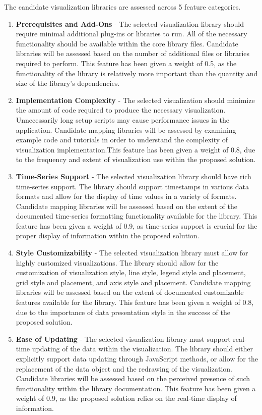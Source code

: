 \documentclass{report}
\begin{document}
The candidate visualization libraries are assessed across 5 feature categories.

\begin{enumerate}

\item \textbf{Prerequisites and Add-Ons} - The selected visualization library should require minimal additional plug-ins or libraries to run. All of the necessary functionality should be available within the core library files. Candidate libraries will be assessed based on the number of additional files or libraries required to perform. This feature has been given a weight of 0.5, as the functionality of the library is relatively more important than the quantity and size of the library's dependencies.

\item \textbf{Implementation Complexity} - The selected visualization should minimize the amount of code required to produce the necessary visualization. Unnecessarily long setup scripts may cause performance issues in the application. Candidate mapping libraries will be assessed by examining example code and tutorials in order to understand the complexity of visualization implementation.This feature has been given a weight of 0.8, due to the frequency and extent of visualization use within the proposed solution.

\item \textbf{Time-Series Support} - The selected visualization library should have rich time-series support. The library should support timestamps in various data formats and allow for the display of time values in a variety of formats. Candidate mapping libraries will be assessed based on the extent of the documented time-series formatting functionality available for the library. This feature has been given a weight of 0.9, as time-series support is crucial for the proper display of information within the proposed solution.

\item \textbf{Style Customizability} - The selected visualization library must allow for highly customized visualizations. The library should allow for the customization of visualization style, line style, legend style and placement, grid style and placement, and axis style and placement. Candidate mapping libraries will be assessed based on the extent of documented customizable features available for the library. This feature has been given a weight of 0.8, due to the importance of data presentation style in the success of the proposed solution.

\item \textbf{Ease of Updating} - The selected visualization library must support real-time updating of the data within the visualization. The library should either explicitly support data updating through JavaScript methods, or allow for the replacement of the data object and the redrawing of the visualization. Candidate libraries will be assessed based on the perceived presence of such functionality within the library documentation. This feature has been given a weight of 0.9, as the proposed solution relies on the real-time display of information.

\end{enumerate}
\end{document}
